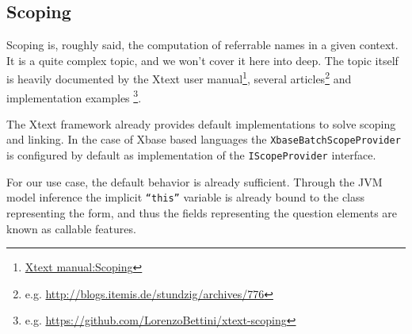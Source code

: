 \subsection{Scoping} \label{sec:scoping}

Scoping is, roughly said, the computation of referrable names in a given
context. It is a quite complex topic, and we won't cover it here into deep.
The topic itself is heavily documented by the Xtext user
manual\footnote{\href{http://www.eclipse.org/Xtext/documentation.html\#scoping}{Xtext
manual:Scoping}}, several articles\footnote{e.g.
\url{http://blogs.itemis.de/stundzig/archives/776}} and implementation examples
\footnote{e.g. \url{https://github.com/LorenzoBettini/xtext-scoping}}.

The Xtext framework already provides default implementations to solve scoping
and linking. In the case of Xbase based languages the
\texttt{XbaseBatchScopeProvider} is configured by default as implementation of
the \texttt{IScopeProvider} interface.

For our use case, the default behavior is already sufficient. Through the
JVM model inference the implicit \texttt{``this''} variable is already bound to the class
representing the form, and thus the fields representing the question elements
are known as callable features.


